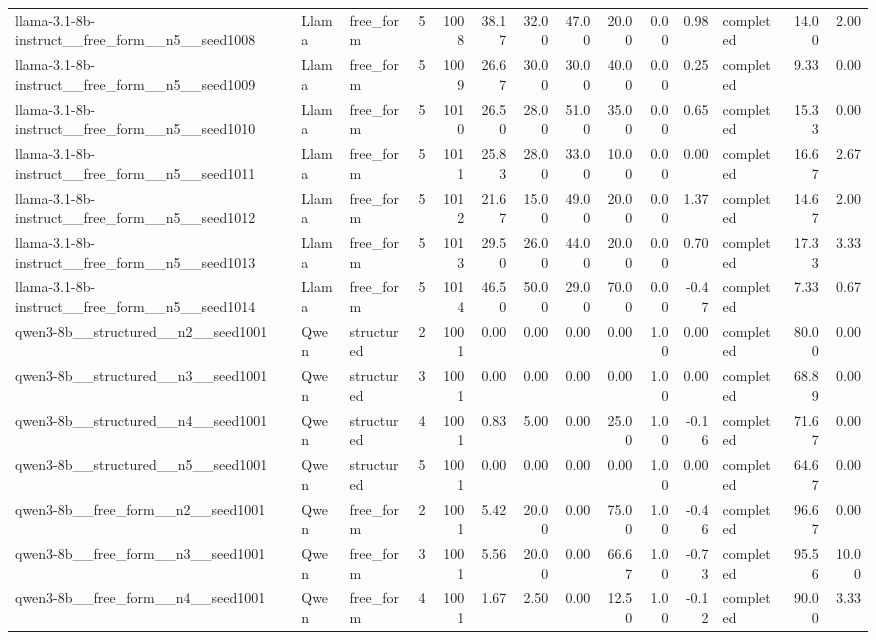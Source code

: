 \begin{longtable}{lllrrrrrrrrlrr}
llama-3.1-8b-instruct\_\_free\_form\_\_n5\_\_seed1008 & Llama & free\_form & 5 & 1008 & 38.17 & 32.00 & 47.00 & 20.00 & 0.00 & 0.98 & completed & 14.00 & 2.00 \\
llama-3.1-8b-instruct\_\_free\_form\_\_n5\_\_seed1009 & Llama & free\_form & 5 & 1009 & 26.67 & 30.00 & 30.00 & 40.00 & 0.00 & 0.25 & completed & 9.33 & 0.00 \\
llama-3.1-8b-instruct\_\_free\_form\_\_n5\_\_seed1010 & Llama & free\_form & 5 & 1010 & 26.50 & 28.00 & 51.00 & 35.00 & 0.00 & 0.65 & completed & 15.33 & 0.00 \\
llama-3.1-8b-instruct\_\_free\_form\_\_n5\_\_seed1011 & Llama & free\_form & 5 & 1011 & 25.83 & 28.00 & 33.00 & 10.00 & 0.00 & 0.00 & completed & 16.67 & 2.67 \\
llama-3.1-8b-instruct\_\_free\_form\_\_n5\_\_seed1012 & Llama & free\_form & 5 & 1012 & 21.67 & 15.00 & 49.00 & 20.00 & 0.00 & 1.37 & completed & 14.67 & 2.00 \\
llama-3.1-8b-instruct\_\_free\_form\_\_n5\_\_seed1013 & Llama & free\_form & 5 & 1013 & 29.50 & 26.00 & 44.00 & 20.00 & 0.00 & 0.70 & completed & 17.33 & 3.33 \\
llama-3.1-8b-instruct\_\_free\_form\_\_n5\_\_seed1014 & Llama & free\_form & 5 & 1014 & 46.50 & 50.00 & 29.00 & 70.00 & 0.00 & -0.47 & completed & 7.33 & 0.67 \\
qwen3-8b\_\_structured\_\_n2\_\_seed1001 & Qwen & structured & 2 & 1001 & 0.00 & 0.00 & 0.00 & 0.00 & 1.00 & 0.00 & completed & 80.00 & 0.00 \\
qwen3-8b\_\_structured\_\_n3\_\_seed1001 & Qwen & structured & 3 & 1001 & 0.00 & 0.00 & 0.00 & 0.00 & 1.00 & 0.00 & completed & 68.89 & 0.00 \\
qwen3-8b\_\_structured\_\_n4\_\_seed1001 & Qwen & structured & 4 & 1001 & 0.83 & 5.00 & 0.00 & 25.00 & 1.00 & -0.16 & completed & 71.67 & 0.00 \\
qwen3-8b\_\_structured\_\_n5\_\_seed1001 & Qwen & structured & 5 & 1001 & 0.00 & 0.00 & 0.00 & 0.00 & 1.00 & 0.00 & completed & 64.67 & 0.00 \\
qwen3-8b\_\_free\_form\_\_n2\_\_seed1001 & Qwen & free\_form & 2 & 1001 & 5.42 & 20.00 & 0.00 & 75.00 & 1.00 & -0.46 & completed & 96.67 & 0.00 \\
qwen3-8b\_\_free\_form\_\_n3\_\_seed1001 & Qwen & free\_form & 3 & 1001 & 5.56 & 20.00 & 0.00 & 66.67 & 1.00 & -0.73 & completed & 95.56 & 10.00 \\
qwen3-8b\_\_free\_form\_\_n4\_\_seed1001 & Qwen & free\_form & 4 & 1001 & 1.67 & 2.50 & 0.00 & 12.50 & 1.00 & -0.12 & completed & 90.00 & 3.33 \\

\end{longtable}
